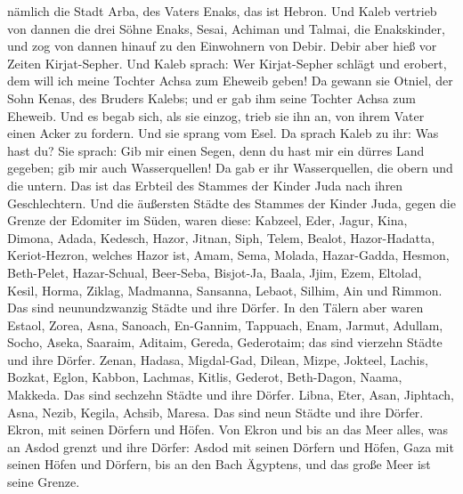 nämlich die Stadt Arba, des Vaters Enaks, das ist Hebron.
 Und Kaleb vertrieb von dannen die drei Söhne Enaks,
Sesai, Achiman und Talmai, die Enakskinder,  und zog von
dannen hinauf zu den Einwohnern von Debir. Debir aber hieß vor Zeiten
Kirjat-Sepher.  Und Kaleb sprach: Wer Kirjat-Sepher
schlägt und erobert, dem will ich meine Tochter Achsa zum Eheweib geben!
 Da gewann sie Otniel, der Sohn Kenas, des Bruders
Kalebs; und er gab ihm seine Tochter Achsa zum Eheweib. 
Und es begab sich, als sie einzog, trieb sie ihn an, von ihrem Vater
einen Acker zu fordern. Und sie sprang vom Esel. Da sprach Kaleb zu ihr:
 Was hast du? Sie sprach: Gib mir einen Segen, denn du
hast mir ein dürres Land gegeben; gib mir auch Wasserquellen! Da gab er
ihr Wasserquellen, die obern und die untern.  Das ist das
Erbteil des Stammes der Kinder Juda nach ihren Geschlechtern.
 Und die äußersten Städte des Stammes der Kinder Juda,
gegen die Grenze der Edomiter im Süden, waren diese: Kabzeel,
 Eder, Jagur, Kina, Dimona, Adada, 
Kedesch, Hazor, Jitnan, Siph, Telem,  Bealot,
Hazor-Hadatta, Keriot-Hezron,  welches Hazor ist,
 Amam, Sema, Molada,  Hazar-Gadda, Hesmon,
Beth-Pelet,  Hazar-Schual, Beer-Seba, Bisjot-Ja,
 Baala, Jjim, Ezem, Eltolad, Kesil, 
Horma, Ziklag, Madmanna, Sansanna,  Lebaot, Silhim, Ain
und Rimmon.  Das sind neunundzwanzig Städte und ihre
Dörfer.  In den Tälern aber waren Estaol, 
Zorea, Asna, Sanoach, En-Gannim,  Tappuach, Enam, Jarmut,
 Adullam, Socho, Aseka, Saaraim, Aditaim, Gereda,
Gederotaim;  das sind vierzehn Städte und ihre Dörfer.
 Zenan, Hadasa, Migdal-Gad, Dilean, 
Mizpe, Jokteel, Lachis, Bozkat, Eglon,  Kabbon, Lachmas,
Kitlis, Gederot,  Beth-Dagon, Naama, Makkeda. Das sind
sechzehn Städte und ihre Dörfer.  Libna, Eter, Asan,
Jiphtach, Asna, Nezib,  Kegila, Achsib, Maresa.
 Das sind neun Städte und ihre Dörfer. 
Ekron, mit seinen Dörfern und Höfen.  Von Ekron und bis
an das Meer alles, was an Asdod grenzt und ihre Dörfer: 
Asdod mit seinen Dörfern und Höfen, Gaza mit seinen Höfen und Dörfern,
bis an den Bach Ägyptens, und das große Meer ist seine Grenze.
